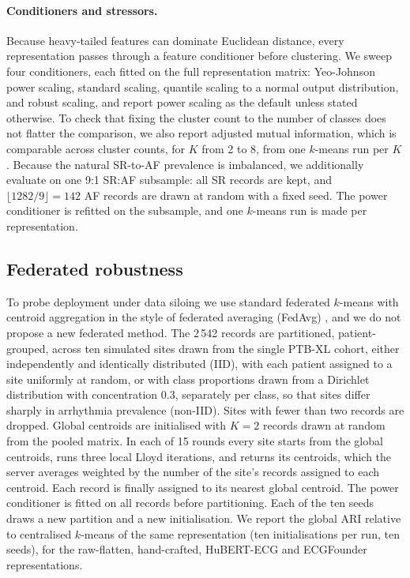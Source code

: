 \documentclass[preprint,11pt]{elsarticle}
\begin{document}
\paragraph{Conditioners and stressors.} Because heavy-tailed features can dominate
Euclidean distance, every representation passes through a feature conditioner before
clustering. We sweep four conditioners, each fitted on the full representation matrix:
Yeo-Johnson power scaling, standard scaling, quantile scaling to a normal output
distribution, and robust scaling, and report power scaling as the default unless stated
otherwise. To check that fixing the cluster count to the number of classes does not
flatter the comparison, we also report adjusted mutual information, which is comparable
across cluster counts, for $K$ from 2 to 8, from one $k$-means run per $K$. Because the
natural SR-to-AF prevalence is imbalanced, we additionally evaluate on one 9:1 SR:AF
subsample: all SR records are kept, and $\lfloor 1282/9 \rfloor = 142$ AF records are
drawn at random with a fixed seed. The power conditioner is refitted on the subsample, and
one $k$-means run is made per representation.

\subsection{Federated robustness}

To probe deployment under data siloing we use standard federated $k$-means with
centroid aggregation in the style of federated averaging (FedAvg) \cite{fedavg2017}, and
we do not propose a new federated method. The 2\,542 records are partitioned, patient-grouped,
across ten simulated sites drawn from the single PTB-XL cohort, either independently and
identically distributed (IID), with each patient assigned to a site uniformly at random,
or with class proportions drawn from a Dirichlet distribution with concentration 0.3,
separately per class, so that sites differ sharply in arrhythmia prevalence (non-IID).
Sites with fewer than two records are dropped. Global centroids are initialised with $K=2$
records drawn at random from the pooled matrix. In each of 15 rounds every site starts
from the global centroids, runs three local Lloyd iterations, and returns its centroids,
which the server averages weighted by the number of the site's records assigned to each
centroid. Each record is finally assigned to its nearest global centroid. The power
conditioner is fitted on all records before partitioning. Each of the ten seeds draws a
new partition and a new initialisation. We report the global ARI relative to centralised
$k$-means of the same representation (ten initialisations per run, ten seeds), for the
raw-flatten, hand-crafted, HuBERT-ECG and ECGFounder representations.
\end{document}
